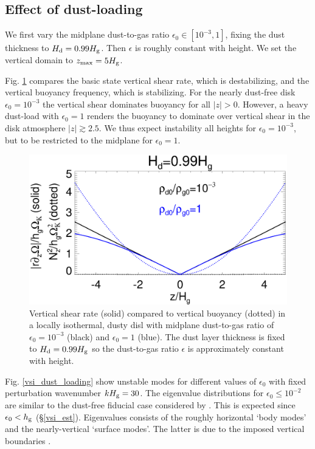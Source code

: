 
\subsection{Effect of dust-loading}
We first vary the midplane dust-to-gas ratio 
$\epsilon_0\in[10^{-3},1]$, fixing the dust thickness to  
$H_\mathrm{d}=0.99H_\mathrm{g}$. Then  $\epsilon$ is roughly constant with height. We
set the vertical domain to $z_\mathrm{max}=5H_\mathrm{g}$.  

Fig. \ref{compare_vshear_fixHd} compares the basic state
vertical shear rate, which is destabilizing, and the vertical buoyancy
frequency, which is stabilizing. For the nearly dust-free disk
$\epsilon_0=10^{-3}$ the vertical shear dominates buoyancy for all
$|z|>0$. However, a heavy dust-load with $\epsilon_0=1$ renders the 
buoyancy to dominate over vertical shear in the disk atmosphere 
$|z|\gtrsim 2.5$. We thus expect instability all heights for 
$\epsilon_0=10^{-3}$, but to be restricted to the midplane for
$\epsilon_0=1$. 

\begin{figure}
  \includegraphics[width=\linewidth]{figures/compare_vshear_Nz2_fixHd} 
  \caption{Vertical shear rate (solid) compared to vertical buoyancy
    (dotted) in a locally isothermal, dusty disl with midplane dust-to-gas ratio
    of $\epsilon_0=10^{-3}$ (black) and $\epsilon_0=1$ (blue). 
    The dust layer thickness is fixed to $H_\mathrm{d}=0.99H_\mathrm{g}$ so the 
    dust-to-gas ratio $\epsilon$ is approximately constant with
    height. 
    \label{compare_vshear_fixHd}
    }
\end{figure}

Fig. \ref{vsi_dust_loading} show unstable modes for different values
of $\epsilon_0$ with fixed perturbation wavenumber  $kH_\mathrm{g} = 30$. The
eigenvalue distributions for $\epsilon_0 \leq 10^{-2}$ are similar to the
dust-free fiducial case considered by . This is
expected since $\epsilon_0 < h_\mathrm{g}$ (\S\ref{vsi_est}). Eigenvalues 
consists 
of the roughly horizontal `body modes' and the nearly-vertical
`surface modes'. The latter is due to the imposed vertical boundaries
\citep{barker15}.  


